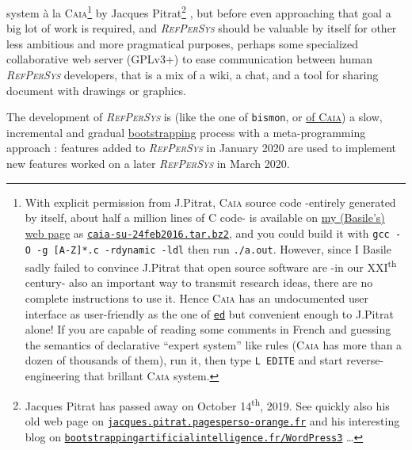 \documentclass[11pt,a4paper,svgnames]{article}
\newcommand{\RefPerSys}{{\textit{\textsc{RefPerSys}}}}
\begin{document}
system à la \textsc{Caia}\footnote{With explicit permission from
  J.Pitrat, \textsc{Caia} source code -entirely generated by itself,
  about half a million lines of C code- is available on
  \href{http://starynkevitch.net/Basile/}{my (Basile's) web page} as
  \href{http://starynkevitch.net/Basile/caia-su-24feb2016.tar.bz2}{\texttt{caia-su-24feb2016.tar.bz2}},
  and you could build it with \texttt{gcc -O -g [A-Z]*.c -rdynamic
    -ldl} then run \texttt{./a.out}. However, since I Basile sadly
  failed to convince J.Pitrat that open source
  \cite{Lerner-Tirole:2000:economics-open-source,
    Weber:2004:SuccessOpenSource} software are -in our
  XXI\textsuperscript{th} century- also an important way to transmit
  research ideas, there are no complete instructions to use it. Hence
  \textsc{Caia} has an undocumented user interface as user-friendly as
  the one of \href{https://www.gnu.org/software/ed/}{\texttt{ed}} but
  convenient enough to J.Pitrat alone! If you are capable of reading
  some comments in French and guessing the semantics of declarative
  ``expert system'' like rules (\textsc{Caia} has more than a dozen of
  thousands of them), run it, then type \texttt{L EDITE} and start
  reverse-engineering that brillant \textsc{Caia} system.}  by Jacques
Pitrat\footnote{Jacques Pitrat has passed away on October
  14\textsuperscript{th}, 2019. See quickly also his old web page on
  \href{http://jacques.pitrat.pagesperso-orange.fr/}{\texttt{jacques.pitrat.pagesperso-orange.fr}}
  and his interesting blog on
  \href{http://bootstrappingartificialintelligence.fr/WordPress3/}{\texttt{bootstrappingartificialintelligence.fr/WordPress3}}
  \ldots} \cite{Pitrat:1996:FGCS, Pitrat:2009:AST,
  Pitrat:2009:ArtifBeings}, but before even approaching that goal a
big lot of work is required, and {\RefPerSys} should be valuable by
itself for other less ambitious and more pragmatical purposes, perhaps
some specialized collaborative web server (GPLv3+) to ease
communication between human {\RefPerSys} developers, that is a mix of
a wiki, a chat, and a tool for sharing document with drawings or
graphics.

The development of {\RefPerSys} is (like the one of \texttt{bismon},
or
\href{http://bootstrappingartificialintelligence.fr/WordPress3/?s=CAIA}{of
  \textsc{Caia}}) a slow, incremental and gradual
\href{https://en.wikipedia.org/wiki/Bootstrapping}{bootstrapping}
process with a meta-programming \cite{dormoy:1992:meta,
  hernandez-phillips:2019:debugging-bootstrap} approach : features
added to {\RefPerSys} in January 2020 are used to implement new
features worked on a later {\RefPerSys} in March 2020.
\end{document}
